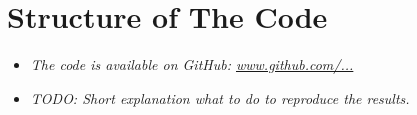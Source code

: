 \section{Structure of The Code}\label{sec:structure-of-the-code}

\begin{itemize}
    \item \textit{The code is available on GitHub: \url{www.github.com/...}}
    \item \textit{TODO: Short explanation what to do to reproduce the results.}
\end{itemize}






